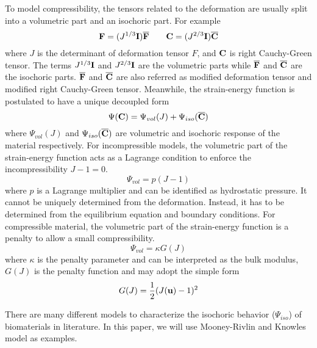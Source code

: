 To model compressibility, the tensors related to the deformation are usually split into a volumetric part and an isochoric part. For example
\begin{equation} \label{split1}
\bold{F} = (J^{1/3}\bold{I})\overline{\bold{F}}
\qquad
\bold{C} = (J^{2/3}\bold{I})\overline{\bold{C}}
\end{equation}
where $J$ is the determinant of deformation tensor $F$, and $\bold{C}$ is right Cauchy-Green tensor. The terms $J^{1/3}\bold{I}$ and $J^{2/3}\bold{I}$ are the volumetric parts while $\overline{\bold{F}}$ and $\overline{\bold{C}}$ are the isochoric parts. $\overline{\bold{F}}$ and $\overline{\bold{C}}$ are also referred as modified deformation tensor and modified right Cauchy-Green tensor. Meanwhile, the strain-energy function is postulated to have a unique decoupled form
\begin{equation} \label{split2}
\Psi(\bold{C}) = \Psi_{vol}(J) + \Psi_{iso}(\overline{\bold{C}})
\end{equation}
where $\Psi_{vol}(J)$ and $\Psi_{iso}(\overline{\bold{C}})$ are volumetric and isochoric response of the material respectively. For incompressible models, the volumetric part of the strain-energy function acts as a Lagrange condition to enforce the incompressibility $J -1 = 0$.
\begin{equation} \label{Lagrange}
\Psi_{vol} = p(J-1)
\end{equation} 
where $p$ is a Lagrange multiplier and can be identified as hydrostatic pressure. It cannot be uniquely determined from the deformation. Instead, it has to be determined from the equilibrium equation and boundary conditions. For compressible material, the volumetric part of the strain-energy function is a penalty to allow a small compressibility.
\begin{equation} \label{penalty}
\Psi_{vol} = \kappa{G(J)}
\end{equation}
where $\kappa$ is the penalty parameter and can be interpreted as the bulk modulus, $G(J)$ is the penalty function and may adopt the simple form
\begin{equation} \label{penalty2}
G(J) = \frac{1}{2}(J(\bold{u}) - 1 )^2
\end{equation}

There are many different models to characterize the isochoric behavior ($\Psi_{iso}$) of biomaterials in literature.  In this paper, we will use Mooney-Rivlin and Knowles model as examples.
%
